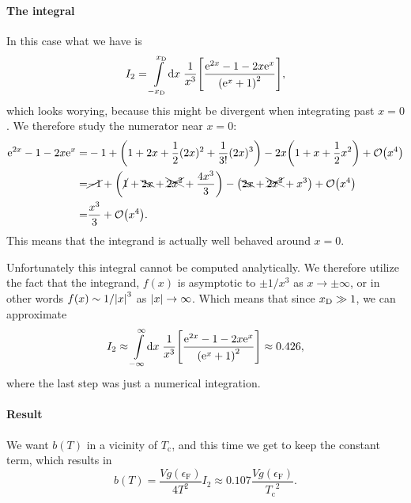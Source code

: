 \documentclass[11pt,letter, swedish, english
]{article}
\newcommand{\Tc}{\ensuremath{T_{\text{c}}}}
\newcommand{\eF}{\ensuremath{\epsilon_{\text{F}}}}
\begin{document}
\paragraph{The integral}
In this case what we have is 
\begin{equation}
I_2=\int_{-\xD}^{\xD}\!\rd{x}\;
\frac{1}{x^3}
\qty[
\frac{\ee^{2x}-1-2x\ee^{x}}{\qty(\ee^{x}+1)^2}
],
\end{equation}
which looks worying, because this might be divergent when integrating
past $x=0$. 
We therefore study the numerator near $x=0$:
\begin{equation}
\begin{aligned}
\ee^{2x}-1-2x\ee^{x}=&-1 + \qty(1+2x+\frac{1}{2}(2x)^2+\frac{1}{3!}(2x)^3)
-2x\qty(1+x +\frac{1}{2}x^2) +\order{x^4}\\
=&\cancel{-1}+\qty(\cancel{1}+\bcancel{2x}+\xcancel{2x^2}+\frac{4x^3}{3})
-\qty(\bcancel{2x}+\xcancel{2x^2} +x^3) +\order{x^4}\\
=&\frac{x^3}{3}+\order{x^4}.
\end{aligned}
\end{equation}
This means that the integrand is actually well behaved around $x=0$.


Unfortunately this integral cannot be computed analytically. We
therefore utilize the fact that the integrand, $f(x)$ is asymptotic to
$\pm1/x^3$ as $x\to\pm\infty$, or in other words $f(x)\sim1/\abs{x}^3$ as
$\abs{x}\to\infty$. Which means that since $x_{\text{D}}\gg1$, we can
approximate
\begin{equation}
I_2\approx\int_{-\infty}^{\infty}\!\rd{x}\;
\frac{1}{x^3}
\qty[\frac{\ee^{2x}-1-2x\ee^{x}}{\qty(\ee^{x}+1)^2}]
\approx 0.426,
\end{equation}
where the last step was just a numerical integration.

\paragraph{Result}
We want $b(T)$ in a vicinity of $\Tc$, and this time we get to keep
the constant term, which results in
\begin{equation}\label{eq:2_b}
b(T)=\frac{Vg(\eF)}{4T^2}I_2
\approx 0.107\frac{Vg(\eF)}{\Tc^2}.
\end{equation}
\end{document}
